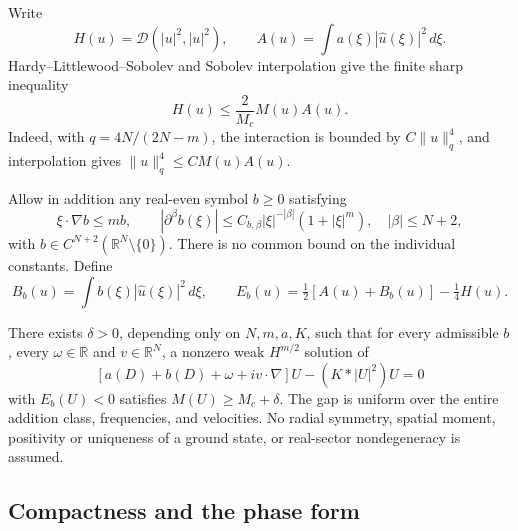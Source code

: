 Write
\[
 H(u)=\mathcal D(|u|^2,|u|^2),\qquad
 A(u)=\int a(\xi)|\widehat u(\xi)|^2\,d\xi.
\]
Hardy--Littlewood--Sobolev and Sobolev interpolation give the finite
sharp inequality
\begin{equation}\label{r10:hartree-gn}
 H(u)\le\frac{2}{M_c}M(u)A(u).
\end{equation}
Indeed, with $q=4N/(2N-m)$, the interaction is bounded by
$C\|u\|_q^4$, and interpolation gives
$\|u\|_q^4\le C M(u)A(u)$.

Allow in addition any real-even symbol $b\ge0$ satisfying
\begin{equation}\label{r10:hartree-bclass}
 \xi\cdot\nabla b\le mb,\qquad
 |\partial^\beta b(\xi)|\le C_{b,\beta}|\xi|^{-|\beta|}
                    (1+|\xi|^m),\quad |\beta|\le N+2,
\end{equation}
with $b\in C^{N+2}(\mathbb R^N\setminus\{0\})$.
There is no common bound on the individual constants.
Define
\[
 B_b(u)=\int b(\xi)|\widehat u(\xi)|^2\,d\xi,
 \qquad E_b(u)=\tfrac12[A(u)+B_b(u)]-\tfrac14H(u).
\]

\begin{theorem}
\label{thm:r10-hartree-gap}
There exists $\delta>0$, depending only on $N,m,a,K$, such that
for every admissible $b$, every $\omega\in\mathbb R$ and
$v\in\mathbb R^N$, a nonzero weak $H^{m/2}$ solution of
\begin{equation}\label{r10:hartree-profile}
 [a(D)+b(D)+\omega+iv\cdot\nabla]U-(K*|U|^2)U=0
\end{equation}
with $E_b(U)<0$ satisfies $M(U)\ge M_c+\delta$.
The gap is uniform over the entire addition class, frequencies,
and velocities. No radial symmetry, spatial moment, positivity or
uniqueness of a ground state, or real-sector nondegeneracy is assumed.
\end{theorem}

\subsection{Compactness and the phase form}

